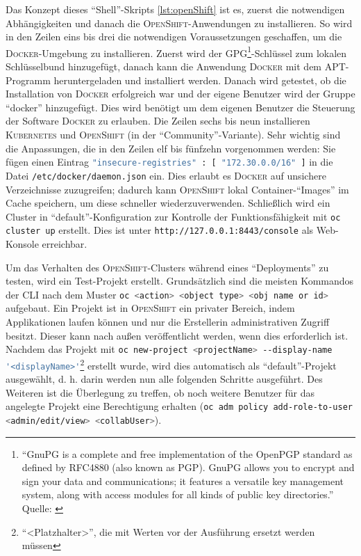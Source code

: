 Das Konzept dieses \enquote{Shell}-Skripts \vref{lst:openShift} ist es, zuerst die notwendigen Abhängigkeiten und danach die \textsc{OpenShift}-Anwendungen zu installieren. So wird in den Zeilen eins bis drei die notwendigen Voraussetzungen geschaffen, um die \textsc{Docker}-Umgebung zu installieren. Zuerst wird der \textsc{GPG}\footnote{\enquote{GnuPG is a complete and free implementation of the OpenPGP standard as defined by RFC4880 (also known as PGP). GnuPG allows you to encrypt and sign your data and communications; it features a versatile key management system, along with access modules for all kinds of public key directories.} Quelle: \cite{the_people_of_the_gnupg_project_gnu_2020}}-Schlüssel zum lokalen Schlüsselbund hinzugefügt, danach kann die Anwendung \textsc{Docker} mit dem \ac{APT}-Programm heruntergeladen und installiert werden. Danach wird getestet, ob die Installation von \textsc{Docker} erfolgreich war und der eigene Benutzer wird der Gruppe \enquote{docker} hinzugefügt. Dies wird benötigt um dem eigenen Benutzer die Steuerung der Software \textsc{Docker} zu erlauben. Die Zeilen sechs bis neun installieren \textsc{Kubernetes} und \textsc{OpenShift} (in der \enquote{Community}-Variante). Sehr wichtig sind die Anpassungen, die in den Zeilen elf bis fünfzehn vorgenommen werden: Sie fügen einen Eintrag \lstinline[language=bash]|"insecure-registries" : [ "172.30.0.0/16" ]| in die Datei \lstinline[language=bash]|/etc/docker/daemon.json| ein. Dies erlaubt es \textsc{Docker} auf unsichere Verzeichnisse zuzugreifen; dadurch kann \textsc{OpenShift} lokal Container-\enquote{Images} im Cache speichern, um diese schneller wiederzuverwenden. Schließlich wird ein Cluster in \enquote{default}-Konfiguration zur Kontrolle der Funktionsfähigkeit mit \lstinline[language=bash]|oc cluster up| erstellt. Dies ist unter \lstinline[language=HTML, breaklines=true]|http://127.0.0.1:8443/console| als Web-Konsole erreichbar.
\par
Um das Verhalten des \textsc{OpenShift}-Clusters während eines \enquote{Deployments} zu testen, wird ein Test-Projekt erstellt. Grundsätzlich sind die meisten Kommandos der \ac{CLI} nach dem Muster \lstinline[language=sh]|oc <action> <object type> <obj name or id>|\autocite[vgl.][]{red_hat_inc_cli_2020} aufgebaut. Ein Projekt ist in \textsc{OpenShift} ein privater Bereich, indem Applikationen laufen können und nur die Erstellerin administrativen Zugriff besitzt. Dieser kann nach außen veröffentlicht werden, wenn dies erforderlich ist. Nachdem das Projekt mit \lstinline[language=bash]|oc new-project <projectName> --display-name '<displayName>'|\footnote{\enquote{<Platzhalter>}, die mit Werten vor der Ausführung ersetzt werden müssen} erstellt wurde, wird dies automatisch als \enquote{default}-Projekt ausgewählt, d. h. darin werden nun alle folgenden Schritte ausgeführt. Des Weiteren ist die Überlegung zu treffen, ob noch weitere Benutzer für das angelegte Projekt eine Berechtigung erhalten (\lstinline[language=bash]|oc adm policy add-role-to-user <admin/edit/view> <collabUser>|). 
